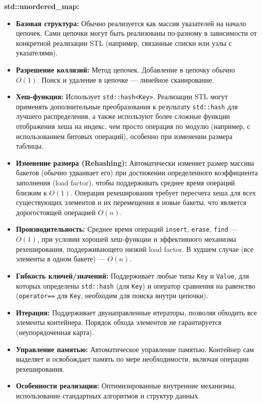 \documentclass[a4paper,12pt]{article}
\begin{document}
\textbf{std::unordered\_map:}
\begin{itemize}
    \item \textbf{Базовая структура:} Обычно реализуется как массив указателей на начало цепочек. Сами цепочки могут быть реализованы по-разному в зависимости от конкретной реализации STL (например, связанные списки или узлы с указателями).
    \item \textbf{Разрешение коллизий:} Метод цепочек. Добавление в цепочку обычно $O(1)$. Поиск и удаление в цепочке --- линейное сканирование.
    \item \textbf{Хеш-функция:} Использует \texttt{std::hash<Key>}. Реализации STL могут применять дополнительные преобразования к результату \texttt{std::hash} для лучшего распределения, а также используют более сложные функции отображения хеша на индекс, чем просто операция по модулю (например, с использованием битовых операций), особенно при изменении размера таблицы.
    \item \textbf{Изменение размера (Rehashing):} Автоматически изменяет размер массива бакетов (обычно удваивает его) при достижении определенного коэффициента заполнения (load factor), чтобы поддерживать среднее время операций близким к $O(1)$. Операция рехеширования требует пересчета хеша для всех существующих элементов и их перемещения в новые бакеты, что является дорогостоящей операцией $O(n)$.
    \item \textbf{Производительность:} Среднее время операций \texttt{insert}, \texttt{erase}, \texttt{find} --- $O(1)$, при условии хорошей хеш-функции и эффективного механизма рехеширования, поддерживающего низкий load factor. В худшем случае (все элементы в одном бакете) --- $O(n)$.
    \item \textbf{Гибкость ключей/значений:} Поддерживает любые типы \texttt{Key} и \texttt{Value}, для которых определены \texttt{std::hash} (для \texttt{Key}) и оператор сравнения на равенство (\texttt{operator==} для \texttt{Key}, необходим для поиска внутри цепочки).
    \item \textbf{Итерация:} Поддерживает двунаправленные итераторы, позволяя обходить все элементы контейнера. Порядок обхода элементов не гарантируется (неупорядоченная карта).
    \item \textbf{Управление памятью:} Автоматическое управление памятью. Контейнер сам выделяет и освобождает память по мере необходимости, включая операции рехеширования.
    \item \textbf{Особенности реализации:} Оптимизированные внутренние механизмы, использование стандартных алгоритмов и структур данных.
\end{itemize}
\end{document}
